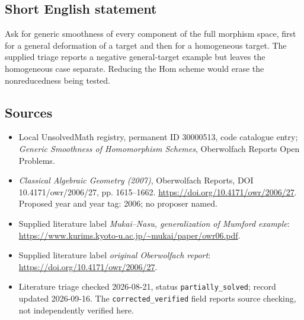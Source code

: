 \documentclass[11pt]{article}
\begin{document}
\subsection{Short English statement}
Ask for generic smoothness of every component of the full morphism space, first for a general deformation of a target and then for a homogeneous target. The supplied triage reports a negative general-target example but leaves the homogeneous case separate. Reducing the Hom scheme would erase the nonreducedness being tested.
\subsection{Sources}
\begin{itemize}\item Local UnsolvedMath registry, permanent ID 30000513, code catalogue entry; \emph{Generic Smoothness of Homomorphism Schemes}, Oberwolfach Reports Open Problems.\item \emph{Classical Algebraic Geometry (2007)}, Oberwolfach Reports, DOI 10.4171/owr/2006/27, pp. 1615--1662. \url{https://doi.org/10.4171/owr/2006/27}. Proposed year and year tag: 2006; no proposer named.\item Supplied literature label \emph{Mukai--Nasu, generalization of Mumford example}: \url{https://www.kurims.kyoto-u.ac.jp/~mukai/paper/owr06.pdf}.\item Supplied literature label \emph{original Oberwolfach report}: \url{https://doi.org/10.4171/owr/2006/27}.\item Literature triage checked 2026-08-21, status \texttt{partially\_solved}; record updated 2026-09-16. The \texttt{corrected\_verified} field reports source checking, not independently verified here.\end{itemize}
\end{document}
